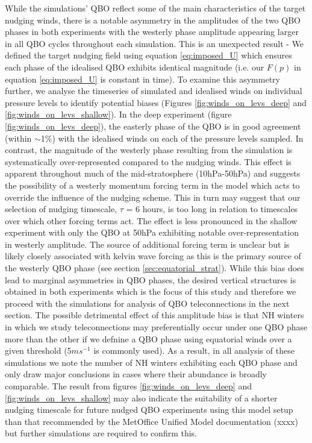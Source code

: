 While the simulations' QBO reflect some of the main characteristics of the target nudging winds, there is a notable asymmetry in the amplitudes of the two QBO phases in both experiments with the westerly phase amplitude appearing larger in all QBO cycles throughout each simulation. This is an unexpected result - We defined the target nudging field using equation \ref{eq:imposed_U} which ensures each phase of the idealised QBO exhibits identical magnitude (i.e. our $F(p)$ in equation \ref{eq:imposed_U} is constant in time). To examine this asymmetry further, we analyse the timeseries of simulated and idealised winds on individual pressure levels to identify potential biases (Figures \ref{fig:winds_on_levs_deep} and \ref{fig:winds_on_levs_shallow}). In the deep experiment (figure \ref{fig:winds_on_levs_deep}), the easterly phase of the QBO is in good agreement (within $\sim$1\%) with the idealised winds on each of the pressure levels sampled. In contrast, the magnitude of the westerly phase resulting from the simulation is systematically over-represented compared to the nudging winds. This effect is apparent throughout much of the mid-stratosphere (10hPa-50hPa) and suggests the possibility of a westerly momentum forcing term in the model which acts to override the influence of the nudging scheme. This in turn may suggest that our selection of nudging timescale, $\tau$ = 6 hours, is too long in relation to timescales over which other forcing terms  act. The effect is less pronounced in the shallow experiment with only the QBO at 50hPa exhibiting notable over-representation in westerly amplitude. The source of additional forcing term is unclear but is likely closely associated with kelvin wave forcing as this is the primary source of the westerly QBO phase (see section \ref{sec:equatorial_strat}). While this bias does lead to marginal asymmetries in QBO phases, the desired vertical structures is obtained in both experiments which is the focus of this study and therefore we proceed with the simulations for analysis of QBO teleconnections in the next section. The possible detrimental effect of this amplitude bias is that NH winters in which we study teleconnections may preferentially occur under one QBO phase more than the other if we defnine a QBO phase using equatorial winds over a given threshold (5$ms^{-1}$ is commonly used). As a result, in all analysis of these simulations we note the number of NH winters exhibiting each QBO phase and only draw major conclusions in cases where their abundance is broadly comparable. The result from figures \ref{fig:winds_on_levs_deep} and \ref{fig:winds_on_levs_shallow} may also indicate the suitability of a shorter nudging timescale for future nudged QBO experiments using this model setup than that recommended by the MetOffice Unified Model documentation (xxxx) but further simulations are required to confirm this.

